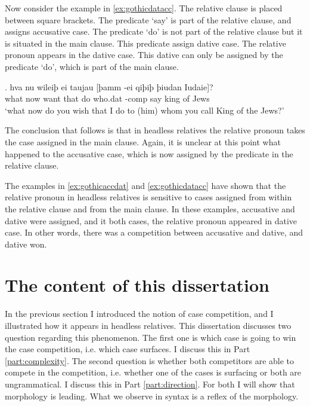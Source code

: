 Now consider the example in \ref{ex:gothicdatacc}. The relative clause is placed between square brackets. The predicate  `say' is part of the relative clause, and assigns accusative case. The predicate  `do' is not part of the relative clause but it is situated in the main clause. This predicate assign dative case. The relative pronoun  appears in the dative case. This dative can only be assigned by the predicate  `do', which is part of the main clause.

\exg. hva nu wileiþ ei taujau [þamm -ei qiþiþ þiudan Iudaie]?\\
 what now want that do\scsub{[dat]} who.\ac{dat} -\ac{comp} say\scsub{[acc]} king {of Jews}\\
 `what now do you wish that I do to (him) whom you call King of the Jews?' \label{ex:gothicdatacc}

The conclusion that follows is that in headless relatives the relative pronoun takes the case assigned in the main clause. Again, it is unclear at this point what happened to the accusative case, which is now assigned by the predicate in the relative clause.

The examples in \ref{ex:gothicaccdat} and \ref{ex:gothicdatacc} have shown that the relative pronoun in headless relatives is sensitive to cases assigned from within the relative clause and from the main clause. In these examples, accusative and dative were assigned, and it both cases, the relative pronoun appeared in dative case. In other words, there was a competition between accusative and dative, and dative won.



\section{The content of this dissertation}

In the previous section I introduced the notion of case competition, and I illustrated how it appears in headless relatives. This dissertation discusses two question regarding this phenomenon.
The first one is which case is going to win the case competition, i.e. which case surfaces. I discuss this in Part \ref{part:complexity}.
The second question is whether both competitors are able to compete in the competition, i.e. whether one of the cases is surfacing or both are ungrammatical. I discuss this in Part \ref{part:direction}.
For both I will show that morphology is leading. What we observe in syntax is a reflex of the morphology.

